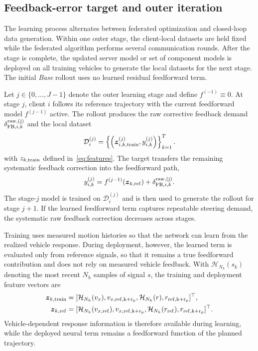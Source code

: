 \subsection{Feedback-error target and outer iteration}
%
The learning process alternates between federated optimization and closed-loop data generation.
Within one outer stage, the client-local datasets are held fixed while the federated algorithm performs several communication rounds.
After the stage is complete, the updated server model or set of component models is deployed on all training vehicles to generate the local datasets for the next stage.
The initial \emph{Base} rollout uses no learned residual feedforward term.

Let $j\in\{0,\ldots,J-1\}$ denote the outer learning stage and define $f^{(-1)}\equiv0$.
At stage $j$, client $i$ follows its reference trajectory with the current feedforward model $f^{(j-1)}$ active.
The rollout produces the raw corrective feedback demand $\delta_{{\rm FB},i,k}^{\rm raw,(j)}$ and the local dataset
%
\begin{equation}
    \mathcal D_i^{(j)}=\left\{\left(\boldsymbol z_{i,k,\rm train}^{(j)},y_{i,k}^{(j)}\right)\right\}_{k=1}^{T}.
    \label{eq:stage_dataset}
\end{equation}
%
with $z_{k,\rm train}$ defined in~\eqref{eq:features}.
The target transfers the remaining systematic feedback correction into the feedforward path,
%
\begin{equation}
    y_{i,k}^{(j)} = f^{(j-1)}(\boldsymbol z_{k,\rm ref})     + \delta_{{\rm FB},i,k}^{\rm raw,(j)}.
    \label{eq:target}
\end{equation}
%
The stage-$j$ model is trained on $\mathcal D_i^{(j)}$ and is then used to generate the rollout for stage $j+1$.
If the learned feedforward term captures repeatable steering demand, the systematic raw feedback correction decreases across stages.

Training uses measured motion histories so that the network can learn from the realized vehicle response. 
During deployment, however, the learned term is evaluated only from reference signals, so that it remains a true feedforward contribution and does not rely on measured vehicle feedback.
With $\mathcal H_{N_h}(s_k)$ denoting the most recent $N_h$ samples of signal $s$, the training and deployment feature vectors are
%
\begin{align}
    \boldsymbol z_{k,\rm train} &=[\mathcal H_{N_h}(v_x),v_{x,\rm ref,k+r_p},\mathcal H_{N_h}(r),r_{\rm ref,k+r_p}]^\top, \label{eq:features} \\ 
    \boldsymbol z_{k,\rm ref} &=[\mathcal H_{N_h}(v_{x,\rm ref}),v_{x,\rm ref,k+r_p},\mathcal H_{N_h}(r_{\rm ref}),r_{\rm ref,k+r_p}]^\top \nonumber.
\end{align}
%
Vehicle-dependent response information is therefore available during learning, while the deployed neural term remains a feedforward function of the planned trajectory.


